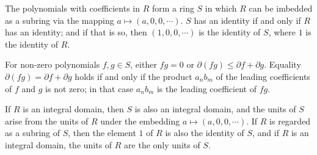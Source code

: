 The polynomials with coefficients in $R$ form a ring $S$ in which $R$ can be imbedded as a subring via the mapping $a \mapsto (a, 0, 0, \cdots)$. $S$ has an identity if and only if $R$ has an identity; and if that is so, then $(1, 0, 0, \cdots)$ is the identity of $S$, where $1$ is the identity of $R$.

For non-zero polynomials $f, g \in S$, either $fg = 0$ or $\partial(fg) \leq \partial f + \partial g$. Equality $\partial(fg) = \partial f + \partial g$ holds if and only if the product $a_n b_m$ of the leading coefficients of $f$ and $g$ is not zero; in that case $a_n b_m$ is the leading coefficient of $fg$.

If $R$ is an integral domain, then $S$ is also an integral domain, and the units of $S$ arise from the units of $R$ under the embedding $a \mapsto (a, 0, 0, \cdots)$. If $R$ is regarded as a subring of $S$, then the element $1$ of $R$ is also the identity of $S$, and if $R$ is an integral domain, the units of $R$ are the only units of $S$.
